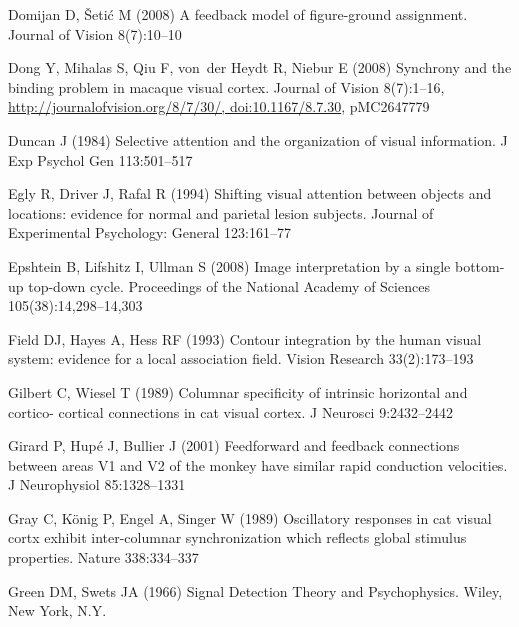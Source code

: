 \begin{thebibliography}{90}
Domijan D, {\v{S}}eti{\'c} M (2008) A feedback model of figure-ground
  assignment. Journal of Vision 8(7):10--10

Dong Y, Mihalas S, Qiu F, von~der Heydt R, Niebur E (2008) {S}ynchrony and the
  binding problem in macaque visual cortex. Journal of {V}ision 8(7):1--16,
  \urlprefix\url{http://journalofvision.org/8/7/30/, doi:10.1167/8.7.30},
  pMC2647779

Duncan J (1984) {Selective attention and the organization of visual
  information}. J Exp Psychol Gen 113:501--517

Egly R, Driver J, Rafal R (1994) {S}hifting visual attention between objects
  and locations: evidence for normal and parietal lesion subjects. Journal of
  Experimental Psychology: General 123:161--77

Epshtein B, Lifshitz I, Ullman S (2008) {I}mage interpretation by a single
  bottom-up top-down cycle. Proceedings of the National Academy of Sciences
  105(38):14,298--14,303

Field DJ, Hayes A, Hess RF (1993) {C}ontour integration by the human visual
  system: evidence for a local association field. Vision Research
  33(2):173--193

Gilbert C, Wiesel T (1989) {C}olumnar specificity of intrinsic horizontal and
  cortico- cortical connections in cat visual cortex. J Neurosci 9:2432--2442

Girard P, Hup\'{e} J, Bullier J (2001) {F}eedforward and feedback connections
  between areas {V}1 and {V}2 of the monkey have similar rapid conduction
  velocities. J Neurophysiol 85:1328--1331

Gray C, {K\"onig} P, Engel A, Singer W (1989) {O}scillatory responses in cat
  visual cortx exhibit inter-columnar synchronization which reflects global
  stimulus properties. Nature 338:334--337

Green DM, Swets JA (1966) {S}ignal {D}etection {T}heory and {P}sychophysics.
  Wiley, New York, N.Y.


\end{thebibliography}
